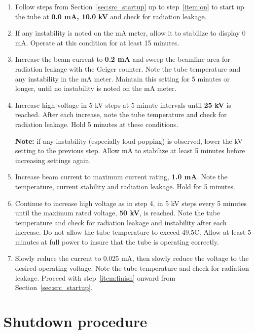 \begin{enumerate}

\item Follow steps from Section~\ref{sec:src_startup} up to step~\ref{item:on} to start up the tube at \textbf{0.0 mA, 10.0 kV} and check for radiation leakage.

\item If any instability is noted on the mA meter, allow it to stabilize to display 0 mA. Operate at this condition for at least 15 minutes.

\item Increase the beam current to \textbf{0.2 mA} and sweep the beamline area for radiation leakage with the Geiger counter. Note the tube temperature and any instability in the mA meter. Maintain this setting for 5 minutes or longer, until no instability is noted on the mA meter.

\item Increase high voltage in 5 kV steps at 5 minute intervals until \textbf{25 kV} is reached. After each increase, note the tube temperature and check for radiation leakage. Hold 5 minutes at these conditions.

\textbf{Note:} if any instability (especially loud popping) is observed, lower the kV setting to the previous step. Allow mA to stabilize at least 5 minutes before increasing settings again.

\item Increase beam current to maximum current rating, \textbf{1.0 mA}. Note the temperature, current stability and radiation leakage. Hold for 5 minutes.

\item Continue to increase high voltage as in step 4, in 5 kV steps every 5 minutes until the maximum rated voltage, \textbf{50 kV}, is reached. Note the tube temperature and check for radiation leakage and instability after each increase. Do not allow the tube temperature to exceed 49.5C. Allow at least 5 minutes at full power to insure that the tube is operating correctly.

\item Slowly reduce the current to 0.025 mA, then slowly reduce the voltage to the desired operating voltage. Note the tube temperature and check for radiation leakage. Proceed with step~\ref{item:finish} onward from Section~\ref{sec:src_startup}.


\end{enumerate}

\section{Shutdown procedure}

